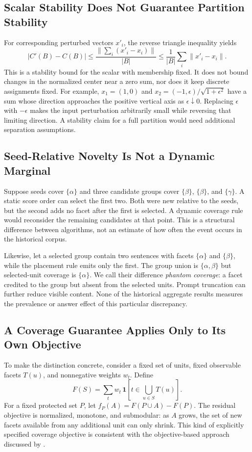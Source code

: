 \documentclass[11pt,a4paper]{article}
\begin{document}
\subsection{Scalar Stability Does Not Guarantee Partition Stability}
For corresponding perturbed vectors $x'_i$, the reverse triangle inequality
yields
\begin{equation}
|C'(B)-C(B)|\leq\frac{\|\sum_i(x'_i-x_i)\|}{|B|}
\leq\frac{1}{|B|}\sum_i\|x'_i-x_i\|.
\end{equation}
This is a stability bound for the scalar with membership fixed. It does not
bound changes in the normalized center near a zero sum, nor does it keep
discrete assignments fixed. For example, $x_1=(1,0)$ and
$x_2=(-1,\epsilon)/\sqrt{1+\epsilon^2}$ have a sum whose direction approaches
the positive vertical axis as $\epsilon\downarrow0$. Replacing $\epsilon$
with $-\epsilon$ makes the input perturbation arbitrarily small while
reversing that limiting direction. A stability claim for a full partition
would need additional separation assumptions.

\subsection{Seed-Relative Novelty Is Not a Dynamic Marginal}
Suppose seeds cover $\{\alpha\}$ and three candidate groups cover
$\{\beta\}$, $\{\beta\}$, and $\{\gamma\}$. A static score order can select
the first two. Both were new relative to the seeds, but the second adds no
facet after the first is selected. A dynamic coverage rule would reconsider
the remaining candidates at that point. This is a structural difference
between algorithms, not an estimate of how often the event occurs in the
historical corpus.

Likewise, let a selected group contain two sentences with facets
$\{\alpha\}$ and $\{\beta\}$, while the placement rule emits only the first.
The group union is $\{\alpha,\beta\}$ but selected-unit coverage is
$\{\alpha\}$. We call their difference \emph{phantom coverage}: a facet
credited to the group but absent from the selected units. Prompt truncation
can further reduce visible content. None of the historical aggregate results
measures the prevalence or answer effect of this particular discrepancy.

\subsection{A Coverage Guarantee Applies Only to Its Own Objective}
To make the distinction concrete, consider a fixed set of units, fixed
observable facets $T(u)$, and nonnegative weights $w_t$. Define
\begin{equation}
F(S)=\sum_t w_t\,\mathbf{1}\left[t\in\bigcup_{u\in S}T(u)\right].
\end{equation}
For a fixed protected set $P$, let $f_P(A)=F(P\cup A)-F(P)$.
The residual objective is normalized, monotone, and submodular: as $A$ grows,
the set of new facets available from any additional unit can only shrink.
This kind of explicitly specified coverage objective is consistent with the
objective-based approach discussed by \citet{lin2011submodular}.
\end{document}
